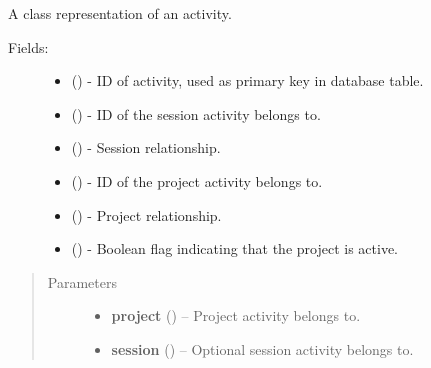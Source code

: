 \documentclass[letterpaper,10pt,english]{sphinxmanual}
\begin{document}
\begin{fulllineitems}
\label{models:models.Activity}
A class representation of an activity.
\begin{description}
\item[{Fields:}] \leavevmode\begin{itemize}
\item {} 
        ()        - ID of activity, used as primary key in database table.

\item {} 
        ()        - ID of the session activity belongs to.

\item {} 
 ()        - Session relationship.

\item {} 
        ()        - ID of the project activity belongs to.

\item {} 
 ()        - Project relationship.

\item {} 
        ()        - Boolean flag indicating that the project is active.

\end{itemize}

\end{description}
\begin{quote}\begin{description}
\item[{Parameters}] \leavevmode\begin{itemize}
\item {} 
\textbf{project} ({\hyperref[models:models.Project]{}}) -- Project activity belongs to.

\item {} 
\textbf{session} ({\hyperref[models:models.Session]{}}) -- Optional session activity belongs to.

\end{itemize}

\end{description}\end{quote}

\end{fulllineitems}
\end{document}
